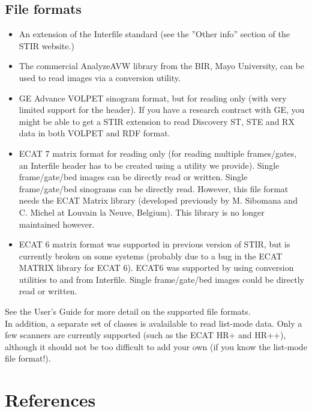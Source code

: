 \documentclass{article}
\begin{document}
\subsection{
File formats}
\begin{itemize}
\item 
An extension of the Interfile standard (see the ''Other info'' section of the STIR website.)
\item 
The commercial AnalyzeAVW library from the BIR, Mayo University, can be used
to read images via a conversion utility.
\item 
GE Advance VOLPET sinogram format, but for reading only (with 
very limited support for the header). If you have a research contract with GE,
you might be able to get a STIR extension to read Discovery ST, STE and RX data in both 
VOLPET and RDF format.
\item 
ECAT 7 matrix format for reading only (for reading multiple
frames/gates, an Interfile 
header has to be created using a utility we provide). Single 
frame/gate/bed images can be directly read or written. Single 
frame/gate/bed sinograms can be directly read.
However, this file format needs the ECAT Matrix library (developed 
previously by M. Sibomana and C. Michel at Louvain la Neuve, Belgium).
This library is no longer maintained however.
\item 
ECAT 6 matrix format was supported in previous version of STIR, but
is currently broken on some systems (probably due to a bug in the ECAT 
MATRIX library for ECAT 6). ECAT6 was supported by using conversion 
utilities to and from 
Interfile. Single frame/gate/bed images could be directly read 
or written.
\end{itemize}

See the User's Guide for more detail on the supported file formats.\\
In addition, a separate set of classes is avalailable
to read list-mode 
data. Only a few scanners are currently supported (such as the 
ECAT HR+ and HR++), although it should not be too difficult to 
add your own (if you know the list-mode file format!). 



\section{
References}
\end{document}
